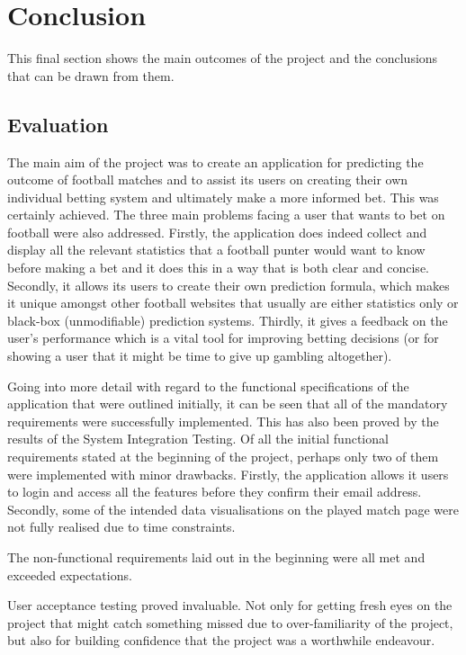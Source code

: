\chapter{Conclusion}
\label{ch:conclusion}
This final section shows the main outcomes of the project and the conclusions that can be drawn from them.

\section{Evaluation}
\label{sec:evaluation_conclusion} 
The main aim of the project was to create an application for predicting the outcome of football matches and to assist its users on creating their own individual betting system and ultimately make a more informed bet. This was certainly achieved. The three main problems facing a user that wants to bet on football were also addressed. Firstly, the application does indeed collect and display all the relevant statistics that a football punter would want to know before making a bet and it does this in a way that is both clear and concise. Secondly, it allows its users to create their own prediction formula, which makes it unique amongst other football websites that usually are either statistics only or black-box (unmodifiable) prediction systems. Thirdly, it gives a feedback on the user's performance which is a vital tool for improving betting decisions (or for showing a user that it might be time to give up gambling altogether).

Going into more detail with regard to the functional specifications of the application that were outlined initially, it can be seen that all of the mandatory requirements were successfully implemented. This has also been proved by the results of the System Integration Testing. Of all the initial functional requirements stated at the beginning of the project, perhaps only two of them were implemented with minor drawbacks. Firstly, the application allows it users to login and access all the features before they confirm their email address. Secondly, some of the intended data visualisations on the played match page were not fully realised due to time constraints.

The non-functional requirements laid out in the beginning were all met and exceeded expectations. 

User acceptance testing proved invaluable. Not only for getting fresh eyes on the project that might catch something missed due to over-familiarity of the project, but also for building confidence that the project was a worthwhile endeavour.


